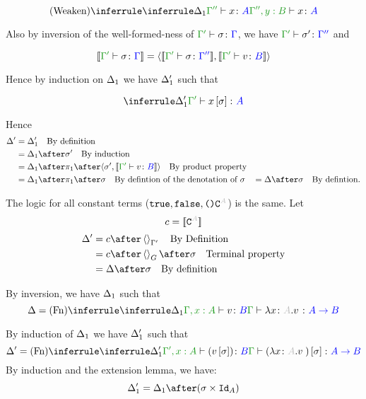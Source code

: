 \documentclass{report}
\begin{document}
\begin{equation}
    \ntreeruleI{Weaken}{\treeruleI{\D_1}{\typerelation{\G''}{x}{A}}}{\typerelation{\G'',y: B}{x}{A}}
\end{equation}

Also by inversion of the well-formed-ness of $\typerelation{\G'}{\si}{\G}$, we have $\typerelation{\G'}{\si'}{\G''}$ and 

\begin{equation}
    \deno{\typerelation{\G'}{\si}{\G}} = \pr{\deno{\typerelation{\G'}{\si}{\G''}}}{\deno{\typerelation{\G'}{v}{B}}}
\end{equation}

Hence by induction on $\Delta_1$ we have $\Delta_1'$ such that

\begin{equation}
    \treeruleI{\D_1'}{\typerelation{\G'}{x\ssi}{A}}
\end{equation}



Hence
\begin{align}
    \D' & = \D_1' \qt{By definition}\\
        & = \D_1\after\si'\qt{By induction}\\
        & = \D_1\after\p\after\pr{\si'}{\deno{\typerelation{\G'}{v}{B}}}\qt{By product property}\\
        & = \D_1\after\p\after\si\qt{By defintion of the denotation of $\si$}
        & = \D\after\si\qt{By defintion.}
\end{align}

The logic for all constant terms ($\t,\f,\u\const{A}$) is the same.
Let
\begin{equation}
    c = \deno{\const{A}}
\end{equation}
\begin{align}
    \D' & = c\after\term{\G'}\qt{By Definition}\\
        & = c\after\term{G}\after\si\qt{Terminal property}\\
        & = \D\after\si\qt{By definition}
\end{align}

By inversion, we have $\Delta_1$ such that
\begin{equation}
    \D = \ntreeruleI{Fn}{
        \treeruleI{\D_1}{\typerelation{\G, x:A}{v}{B}}
    }{\typerelation{\G}{\lam{x}{A}{v}}{\ab}}
\end{equation}

By induction of $\Delta_1$ we have $\Delta_1'$ such that
\begin{equation}
    \D' = \ntreeruleI{Fn}{
        \treeruleI{\D_1'}{\typerelation{\G', x:A}{(v\ssi)}{B}}
    }{\typerelation{\G}{(\lam{x}{A}{v})\ssi}{\ab}}
\end{equation}
By induction and the extension lemma, we have:
\begin{equation}
    \D_1' = \D_1\after(\si\times\Id{A})
\end{equation}
\end{document}
